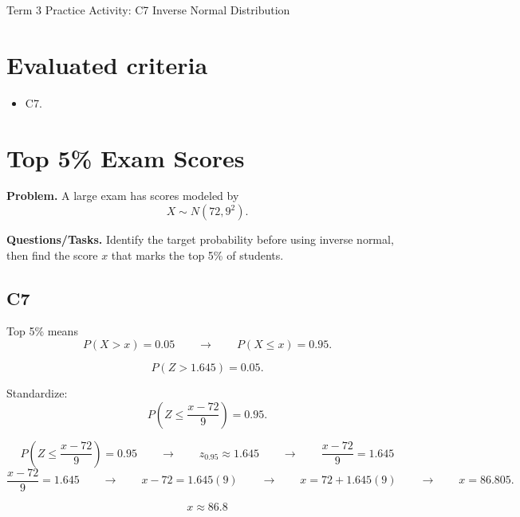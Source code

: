 \makeatletter
{}
\makeatother	






	
	\begin{center}
		{\LARGE Term 3 Practice Activity: C7 Inverse Normal Distribution}
	\end{center}
	
	\tableofcontents
	
	\section*{Evaluated criteria}
	\begin{itemize}[leftmargin=*]
		\item C7.
	\end{itemize}
	
	\section{Top 5\% Exam Scores}
	
	\textbf{Problem.} A large exam has scores modeled by
	\[
	X \sim N(72, 9^2).
	\]
	
	\textbf{Questions/Tasks.} Identify the target probability before using inverse normal, then find the score $x$ that marks the top 5\% of students.
	
	\subsection*{C7}
	
	Top 5\% means
	\[
	P(X > x) = 0.05
	\qquad \longrightarrow \qquad
	P(X \leq x) = 0.95.
	\]
	
	\[
	P(Z>1.645)=0.05.
	\]
	
	
	Standardize:
	\[
	P\left(Z \leq \frac{x - 72}{9}\right) = 0.95.
	\]
	
	\[
	P\left(Z \leq \frac{x - 72}{9}\right)=0.95
	\qquad \longrightarrow \qquad
	z_{0.95}\approx 1.645
	\qquad \longrightarrow \qquad
	\frac{x - 72}{9}=1.645
	\]
	\[
	\frac{x - 72}{9}=1.645
	\qquad \longrightarrow \qquad
	x-72=1.645(9)
	\qquad \longrightarrow \qquad
	x=72+1.645(9)
	\qquad \longrightarrow \qquad
	x=86.805.
	\]
	
	\[
	x \approx 86.8
	\]
	
